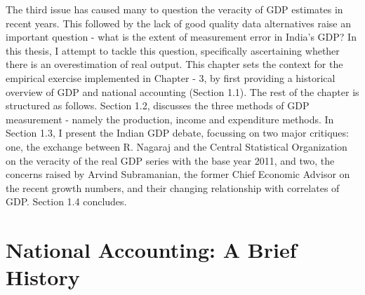 \documentclass[12pt,nobind, a4paper]{reedthesis}
\begin{document}
 The third issue has caused many to question the veracity of GDP estimates in recent years. This followed by the lack of good quality data alternatives raise an important question - what is the extent of measurement error in India's GDP? In this thesis, I attempt to tackle this question, specifically ascertaining whether there is an overestimation of real output. This chapter sets the context for the empirical exercise implemented in Chapter - 3, by first providing a historical overview of GDP and national accounting (Section 1.1). The rest of the chapter is structured as follows. Section 1.2, discusses the three methods of GDP measurement - namely the production, income and expenditure methods. In Section 1.3, I present the Indian GDP debate, focussing on two major critiques: one, the exchange between R. Nagaraj and the Central Statistical Organization on the veracity of the real GDP series with the base year 2011, and two, the concerns raised by Arvind Subramanian, the former Chief Economic Advisor on the recent growth numbers, and their changing relationship with correlates of GDP. Section 1.4 concludes.

 \hypertarget{national-accounting-a-brief-history}{%
 \section{National Accounting: A Brief History}\label{national-accounting-a-brief-history}}
\end{document}
